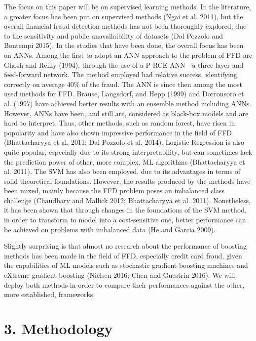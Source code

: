 \documentclass[12pt,]{article}
\begin{document}
The focus on this paper will be on supervised learning methods. In the
literature, a greater focus has been put on supervised methods (Ngai et
al. 2011), but the overall financial fraud detection methods has not
been thoroughly explored, due to the sensitivity and public
unavailaibility of datasets (Dal Pozzolo and Bontempi 2015). In the
studies that have been done, the overall focus has been on ANNs. Among
the first to adopt an ANN approach to the problem of FFD are Ghosh and
Reilly (1994), through the use of a P-RCE ANN - a three layer and
feed-forward network. The method employed had relative success,
identifying correctly on average 40\% of the fraud. The ANN is since
then among the most used methods for FFD. Brause, Langsdorf, and Hepp
(1999) and Dorronsoro et al. (1997) have achieved better results with an
ensemble method including ANNs. However, ANNs have been, and still are,
considered as black-box models and are hard to interpret. Thus, other
methods, such as random forest, have risen in popularity and have also
shown impressive performance in the field of FFD (Bhattacharyya et al.
2011; Dal Pozzolo et al. 2014). Logistic Regression is also quite
popular, especially due to its strong interpretability, but can
sometimes lack the prediction power of other, more complex, ML
algorithms (Bhattacharyya et al. 2011). The SVM has also been employed,
due to its advantages in terms of solid theoretical foundations.
However, the results produced by the methods have been mixed, mainly
because the FFD problem poses an imbalanced class challenge (Chaudhary
and Mallick 2012; Bhattacharyya et al. 2011). Nonetheless, it has been
shown that through changes in the foundations of the SVM method, in
order to transform to model into a cost-sensitive one, better
performance can be achieved on problems with imbalanced data (He and
Garcia 2009).

Slightly surprising is that almost no research about the performance of
boosting methods has been made in the field of FFD, especially credit
card fraud, given the capabilities of ML models such as stochastic
gradient boosting machines and eXtreme gradient boosting (Nielsen 2016;
Chen and Guestrin 2016). We will deploy both methods in order to compare
their performances against the other, more established, frameworks.

\hypertarget{methodology}{%
\section{3. Methodology}\label{methodology}}
\end{document}

